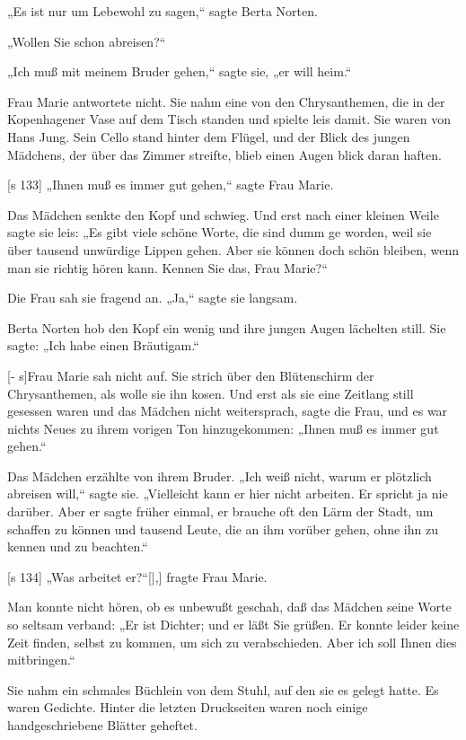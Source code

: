 „Es ist nur um Lebewohl zu sagen,“ sagte
Berta Norten.

„Wollen Sie schon abreisen?“

„Ich muß mit meinem Bruder gehen,“ sagte sie,
„er will heim.“

Frau Marie antwortete nicht. Sie nahm eine
von den Chrysanthemen, die in der Kopenhagener
Vase auf dem Tisch standen und spielte leis damit.
Sie waren von Hans Jung. Sein Cello stand hinter
dem Flügel, und der Blick des jungen Mädchens,
der über das Zimmer streifte, blieb einen Augen­
blick daran haften.

[s 133]
„Ihnen muß es immer gut gehen,“ sagte Frau Marie.

Das Mädchen senkte den Kopf und schwieg.
Und erst nach einer kleinen Weile sagte sie leis:
„Es gibt viele schöne Worte, die sind dumm ge­
worden, weil sie über tausend unwürdige Lippen
gehen. Aber sie können doch schön bleiben, wenn
man sie richtig hören kann. Kennen Sie das, Frau
Marie?“

Die Frau sah sie fragend an. „Ja,“ sagte sie
langsam.

Berta Norten hob den Kopf ein wenig und
ihre jungen Augen lächelten still. Sie sagte: „Ich
habe einen Bräutigam.“

[- s]Frau Marie sah nicht auf. Sie strich über den
Blütenschirm der Chrysanthemen, als wolle sie ihn
kosen. Und erst als sie eine Zeitlang still gesessen
waren und das Mädchen nicht weitersprach, sagte
die Frau, und es war nichts Neues zu ihrem vorigen
Ton hinzugekommen: „Ihnen muß es immer gut gehen.“

Das Mädchen erzählte von ihrem Bruder. „Ich
weiß nicht, warum er plötzlich abreisen will,“ sagte
sie. „Vielleicht kann er hier nicht arbeiten. Er
spricht ja nie darüber. Aber er sagte früher einmal,
er brauche oft den Lärm der Stadt, um schaffen zu
können und tausend Leute, die an ihm vorüber­
gehen, ohne ihn zu kennen und zu beachten.“

[s 134]
„Was arbeitet er?“[|,] fragte Frau Marie.

Man konnte nicht hören, ob es unbewußt geschah,
daß das Mädchen seine Worte so seltsam verband:
„Er ist Dichter; und er läßt Sie grüßen. Er konnte
leider keine Zeit finden, selbst zu kommen, um sich
zu verabschieden. Aber ich soll Ihnen dies mitbringen.“

Sie nahm ein schmales Büchlein von dem Stuhl,
auf den sie es gelegt hatte. Es waren Gedichte.
Hinter die letzten Druckseiten waren noch einige
handgeschriebene Blätter geheftet.

